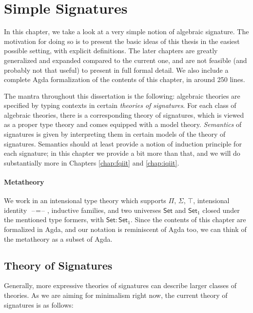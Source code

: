\documentclass[12pt,a4paper,twoside,openany]{book}
\theoremstyle{remark}
\theoremstyle{definition}
\theoremstyle{theorem}
\newcommand{\blank}{\mathord{\hspace{1pt}\text{--}\hspace{1pt}}}
\newcommand{\Set}{\mathsf{Set}}
\begin{document}
\chapter{Simple Signatures}
\label{chap:simple-inductive-signatures}

In this chapter, we take a look at a very simple notion of algebraic
signature. The motivation for doing so is to present the basic ideas of this
thesis in the easiest possible setting, with explicit definitions. The later
chapters are greatly generalized and expanded compared to the current one, and
are not feasible (and probably not that useful) to present in full formal
detail. We also include a complete Agda formalization of the contents of this
chapter, in around 250 lines.

The mantra throughout this dissertation is the following: algebraic theories are
specified by typing contexts in certain \emph{theories of signatures}. For each
class of algebraic theories, there is a corresponding theory of signatures,
which is viewed as a proper type theory and comes equipped with a model
theory. \emph{Semantics} of signatures is given by interpreting them in certain
models of the theory of signatures. Semantics should at least provide a notion
of induction principle for each signature; in this chapter we provide a bit more
than that, and we will do substantially more in Chapters \ref{chap:fqiit} and
\ref{chap:iqiit}.

\subsubsection{Metatheory}

We work in an intensional type theory which supports $\Pi$, $\Sigma$, $\top$,
intensional identity $\blank\!=\!\blank$, inductive families, and two universes
$\Set$ and $\Set_1$ closed under the mentioned type formers, with $\Set :
\Set_1$.  Since the contents of this chapter are formalized in Agda, and our
notation is reminiscent of Agda too, we can think of the metatheory as a
subset of Agda.

\section{Theory of Signatures}
\label{sec:simple-signatures}

Generally, more expressive theories of signatures can describe larger classes of
theories. As we are aiming for minimalism right now, the current theory of
signatures is as follows:
\end{document}

